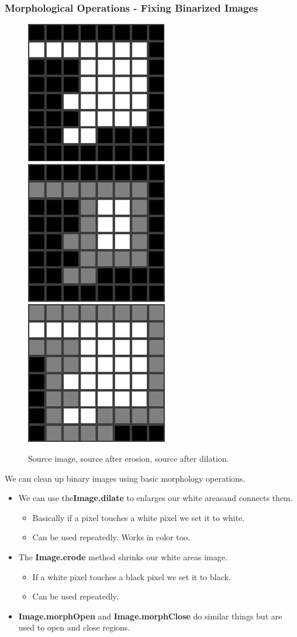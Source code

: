 \documentclass{beamer}
\begin{document}
\begin{frame}
  \frametitle{Morphological Operations - Fixing Binarized Images}
 \begin{figure}
     \includegraphics[width=0.1\linewidth]{morph-src.jpg}
     \quad
     \includegraphics[width=0.1\linewidth]{morph-erode.jpg}
     \quad
     \includegraphics[width=0.1\linewidth]{morph-dilate.jpg}
     \caption{Source image, source after erosion, source after dilation.}
 \end{figure}

We can clean up binary images using basic morphology operations.
\begin{itemize}
\item We can use the\textbf{Image.dilate} to enlarges our white areasand
  connects them.
  \begin{itemize}
  \item Basically if a pixel touches a white pixel we set it to white.
  \item Can be used repeatedly. Works in color too.
  \end{itemize}
\item The \textbf{Image.erode} method shrinks our white areas
  image.
   \begin{itemize}
   \item If a white pixel touches a black pixel we set it to black.
   \item Can be used repeatedly.
  \end{itemize}
\item \textbf{Image.morphOpen} and \textbf{Image.morphClose} do
  similar things but are used to open and close regions.
\end{itemize}
\end{frame}
\end{document}
